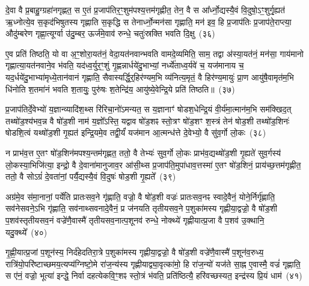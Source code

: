 {\anuvakamend[{द॒भ्नो॒त्यन॑भिषुतस्य गृह्णा॒त्येका॒न्नविꣳ॑श॒तिश्च॑}]}%

दे॒वा वै प्र॒बाहु॒ग्ग्रहा॑नगृह्णत॒ स ए॒तं प्र॒जा\-प॑तिर॒ꣳ॒शुम॑पश्य॒त्तम॑गृह्णीत॒ तेन॒ वै स आ᳚र्ध्नो॒द्यस्यै॒वं वि॒दुषो॒\-ऽꣳ॒शुर्गृ॒ह्यत॑ ऋ॒ध्नोत्ये॒व स॒कृद॑भिषुतस्य गृह्णाति स॒कृद्धि स तेनार्ध्नो॒न्मन॑सा गृह्णाति॒ मन॑ इव॒ हि प्र॒जा\-प॑तिः प्र॒जा\-प॑ते॒राप्त्या॒ औदु॑म्बरेण गृह्णा॒त्यूर्ग्वा उ॑दु॒म्बर॒ ऊर्ज॑मे॒वाव॑ रुन्धे॒ चतुः॑स्रक्ति भवति दि॒क्षु~(३६)

ए॒व प्रति॑ तिष्ठति॒ यो वा अ॒ꣳ॒शोरा॒यत॑नं॒ वेदा॒यत॑नवान्भवति वामदे॒व्यमिति॒ साम॒ तद्वा अ॑स्या॒यत॑नं॒ मन॑सा॒ गाय॑मानो गृह्णात्या॒यत॑नवाने॒व भ॑वति॒ यद॑ध्व॒र्युर॒ꣳ॒शुं गृ॒ह्णन्नार्धये॑दु॒भाभ्यां॒ नर्ध्ये॑ताध्व॒र्यवे॑ च॒ यज॑मानाय च॒ यद॒र्धये॑दु॒भाभ्या॑मृध्ये॒तान॑वानं गृह्णाति॒ सैवास्यर्द्धि॒र्॒\mbox{}हिर॑ण्यम॒भि व्य॑नित्य॒मृतं॒ वै हिर॑ण्य॒मायुः॑ प्रा॒ण आयु॑षै॒वामृत॑म॒भि धि॑नोति श॒तमा॑नं भवति श॒तायुः॒ पुरु॑षः श॒तेन्द्रि॑य॒ आयु॑ष्ये॒वेन्द्रि॒ये प्रति॑ तिष्ठति॥~(३७)

{\anuvakamend[{दि॒क्ष्व॑निति विꣳश॒तिश्च॑}]}%

प्र॒जा\-प॑तिर्दे॒वेभ्यो॑ य॒ज्ञान्व्यादि॑श॒थ्स रि॑रिचा॒नो॑\-ऽमन्यत॒ स य॒ज्ञानाꣳ॑ षोडश॒धेन्द्रि॒यं वी॒र्य॑मा॒त्मान॑म॒भि सम॑क्खिद॒त् तथ्षो॑ड॒श्य॑भव॒न्न वै षो॑ड॒शी नाम॑ य॒ज्ञो᳚\-ऽस्ति॒ यद्वाव षो॑ड॒शꣴ स्तो॒त्रꣳ षो॑ड॒शꣳ श॒स्त्रं तेन॑ षोड॒शी तथ्षो॑ड॒शिनः॑ षोडशि॒त्वं यथ्षो॑ड॒शी गृ॒ह्यत॑ इन्द्रि॒यमे॒व तद्वी॒र्यं॑ यज॑मान आ॒त्मन्ध॑त्ते दे॒वेभ्यो॒ वै सु॑व॒र्गो लो॒कः~(३८)

न प्राभ॑व॒त्त ए॒तꣳ षो॑ड॒शिन॑मपश्य॒न्तम॑गृह्णत॒ ततो॒ वै तेभ्यः॑ सुव॒र्गो लो॒कः प्राभ॑व॒द्यथ्षो॑ड॒शी गृ॒ह्यते॑ सुव॒र्गस्य॑ लो॒कस्या॒भिजि॑त्या॒ इन्द्रो॒ वै दे॒वाना॑मानुजाव॒र आ॑सी॒थ्स प्र॒जा\-प॑ति॒मुपा॑धाव॒त्तस्मा॑ ए॒तꣳ षो॑ड॒शिनं॒ प्राय॑च्छ॒त्तम॑गृह्णीत॒ ततो॒ वै सो\-ऽग्रं॑ दे॒वता॑नां॒ पर्यै॒द्यस्यै॒वं वि॒दुषः॑ षोड॒शी गृ॒ह्यते᳚~(३९)

अग्र॑मे॒व स॑मा॒नानां॒ पर्ये॑ति प्रातःसव॒ने गृ॑ह्णाति॒ वज्रो॒ वै षो॑ड॒शी वज्रः॑ प्रातःसव॒नꣴ स्वादे॒वैनं॒ योने॒र्निर्गृ॑ह्णाति॒ सव॑नेसवने॒\-ऽभि गृ॑ह्णाति॒ सव॑नाथ्सवनादे॒वैनं॒ प्र ज॑नयति तृतीयसव॒ने प॒शुका॑मस्य गृह्णीया॒द्वज्रो॒ वै षो॑ड॒शी प॒शव॑स्तृतीयसव॒नं वज्रे॑णै॒वास्मै॑ तृतीयसव॒नात्प॒शूनव॑ रुन्धे॒ नोक्थ्ये॑ गृह्णीयात्प्र॒जा वै प॒शव॑ उ॒क्थानि॒ यदु॒क्थ्ये᳚~(४०)

गृ॒ह्णी॒यात्प्र॒जां प॒शून॑स्य॒ निर्द॑हेदतिरा॒त्रे प॒शुका॑मस्य गृह्णीया॒द्वज्रो॒ वै षो॑ड॒शी वज्रे॑णै॒वास्मै॑ प॒शून॑व॒रुध्य॒ रात्रि॑यो॒परि॑ष्टाच्छमय॒त्यप्य॑ग्निष्टो॒मे रा॑ज॒न्य॑स्य गृह्णीयाद्व्या॒वृत्का॑मो॒ हि रा॑ज॒न्यो॑ यज॑ते सा॒ह्न ए॒वास्मै॒ वज्रं॑ गृह्णाति॒ स ए॑नं॒ वज्रो॒ भूत्या॑ इन्द्धे॒ निर्वा दहत्येकवि॒ꣳ॒शꣴ स्तो॒त्रं भ॑वति॒ प्रति॑ष्ठित्यै॒ हरि॑वच्छस्यत॒ इन्द्र॑स्य प्रि॒यं धाम॑~(४१)

